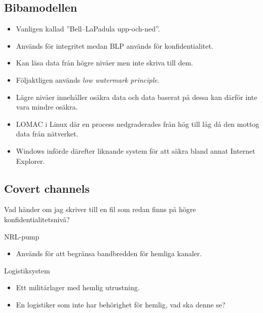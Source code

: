 \subsection{Bibamodellen}
\begin{frame}{\insertsubsectionhead}
  \begin{itemize}
    \item Vanligen kallad ''Bell--LaPadula upp-och-ned''.
    \item Används för integritet medan BLP används för konfidentialitet.
    \item Kan läsa data från högre nivåer men inte skriva till dem.
    \item Följaktligen används \emph{low watermark principle}.
    \item Lägre nivåer innehåller osäkra data och data baserat på dessa kan 
      därför inte vara mindre osäkra.
    \item LOMAC i Linux där en process nedgraderades från hög till låg då den 
      mottog data från nätverket.
    \item Windows införde därefter liknande system för att säkra bland annat 
      Internet Explorer.
  \end{itemize}
\end{frame}

\subsection{Covert channels}

\begin{frame}
  Vad händer om jag skriver till en fil som redan finns på högre 
  konfidentialitetsnivå?
\end{frame}

\begin{frame}{\insertsubsectionhead}{NRL-pump}
  \begin{itemize}
    \item Används för att begränsa bandbredden för hemliga kanaler.
  \end{itemize}
\end{frame}
\begin{frame}{\insertsubsectionhead}{Logistiksystem}
  \begin{itemize}
    \item Ett militärlager med hemlig utrustning.
    \item En logistiker som inte har behörighet för hemlig, vad ska denne se?
  \end{itemize}
\end{frame}



\begin{frame}[allowframebreaks]
  \printbibliography{}
\end{frame}

